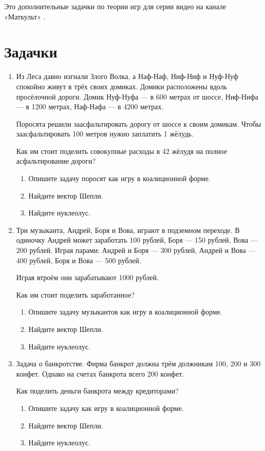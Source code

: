 \documentclass[12pt]{article} %
\theoremstyle{definition} %
\begin{document}
Это дополнительные задачки по теории игр для серии видео на канале «Маткульт» \autocite{mathcult0youtube}.

\section{Задачки}

\begin{enumerate}
\item Из Леса давно изгнали Злого Волка, а Наф-Наф, Ниф-Ниф и Нуф-Нуф спокойно живут в трёх своих домиках. 
Домики расположены вдоль просёлочной дороги. Домик Нуф-Нуфа — в 600 метрах от шоссе, Ниф-Нифа — в 1200 метрах, Наф-Нафа — в 4200 метрах. 

Поросята решили заасфальтировать дорогу от шоссе к своим домикам. 
Чтобы заасфальтировать 100 метров нужно заплатить 1 жёлудь. 

Как им стоит поделить совокупные расходы в 42 жёлудя на полное асфальтирование дороги?

\begin{enumerate}
    \item Опишите задачу поросят как игру в коалиционной форме. 
    \item Найдите вектор Шепли. 
    \item Найдите нуклеолус. 
\end{enumerate}

\item Три музыканта, Андрей, Боря и Вова, играют в подземном переходе. 
В одиночку Андрей может заработать 100 рублей, Боря — 150 рублей, Вова — 200 рублей. 
Играя парами: Андрей и Боря — 300 рублей, Андрей и Вова — 400 рублей, Боря и Вова — 500 рублей. 

Играя втроём они зарабатывают 1000 рублей. 


Как им стоит поделить заработанное?

\begin{enumerate}
    \item Опишите задачу музыкантов как игру в коалиционной форме. 
    \item Найдите вектор Шепли. 
    \item Найдите нуклеолус. 
\end{enumerate}

\item Задача о банкротстве. Фирма банкрот должна трём должникам 100, 200 и 300 конфет. 
Однако на счетах банкрота всего 200 конфет. 

Как поделить деньги банкрота между кредиторами?

\begin{enumerate}
  \item Опишите задачу как игру в коалиционной форме. 
  \item Найдите вектор Шепли.
  \item Найдите нуклеолус. 
\end{enumerate}

    
\end{enumerate}
\end{document}
